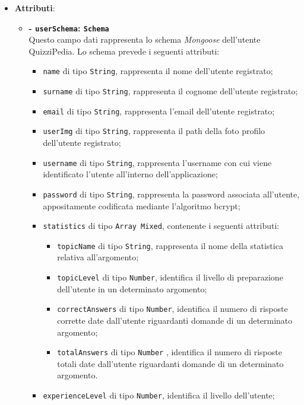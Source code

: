 \begin{itemize}
	\item \textbf{Attributi}: 
		\begin{itemize}
			\item \textbf{- \texttt{userSchema}: \texttt{Schema}} \\
			Questo campo dati rappresenta lo schema \textit{Mongoose} dell'utente QuizziPedia. Lo schema prevede i seguenti attributi:
			\begin{itemize}
				\item 
					\texttt{name} di tipo \texttt{String}, rappresenta il nome  dell'utente registrato;
				\item 
					\texttt{surname} di tipo \texttt{String}, rappresenta il cognome  dell'utente registrato;
				\item 
					\texttt{email} di tipo \texttt{String}, rappresenta l'email  dell'utente registrato;
				\item 
					\texttt{userImg} di tipo \texttt{String}, rappresenta il path della foto profilo dell'utente registrato;
				\item 
					\texttt{username} di tipo \texttt{String}, rappresenta l'username con cui viene identificato l'utente all'interno dell'applicazione;		
				\item
					\texttt{password} di tipo \texttt{String}, rappresenta la password associata all'utente,  appositamente codificata mediante l'algoritmo bcrypt;  		
				\item
					\texttt{statistics} di tipo \texttt{Array Mixed}, contenente i seguenti attributi:
				\begin{itemize}
					\item
						\texttt{topicName} di tipo \texttt{String}, rappresenta il nome della statistica relativa all'argomento;	 
					\item
						 \texttt{topicLevel} di tipo \texttt{Number}, identifica il livello di preparazione dell'utente in un determinato argomento;
					\item
						\texttt{correctAnswers} di tipo \texttt{Number}, identifica il numero di risposte corrette date dall'utente riguardanti domande di un determinato argomento; 
					\item						
						 \texttt{totalAnswers} di tipo \texttt{Number} , identifica il numero di risposte totali date dall'utente riguardanti domande di un determinato argomento.		
				\end{itemize}		
				\item 
					\texttt{experienceLevel} di tipo \texttt{Number}, identifica il livello dell'utente;				
				

\end{itemize}
\end{itemize}
\end{itemize}
